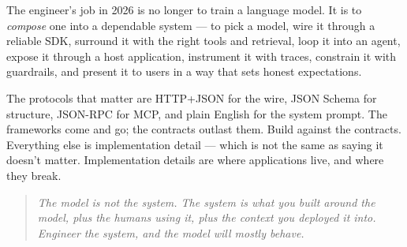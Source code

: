 The engineer's job in 2026 is no longer to train a language
model. It is to \emph{compose} one into a dependable system ---
to pick a model, wire it through a reliable SDK, surround it
with the right tools and retrieval, loop it into an agent,
expose it through a host application, instrument it with traces,
constrain it with guardrails, and present it to users in a way
that sets honest expectations.

The protocols that matter are HTTP+JSON for the wire, JSON
Schema for structure, JSON-RPC for MCP, and plain English for
the system prompt. The frameworks come and go; the contracts
outlast them. Build against the contracts. Everything else is
implementation detail --- which is not the same as saying it
doesn't matter. Implementation details are where applications
live, and where they break.

\begin{quote}
  \itshape The model is not the system. The system is what you
  built around the model, plus the humans using it, plus the
  context you deployed it into. Engineer the system, and the
  model will mostly behave.
\end{quote}
